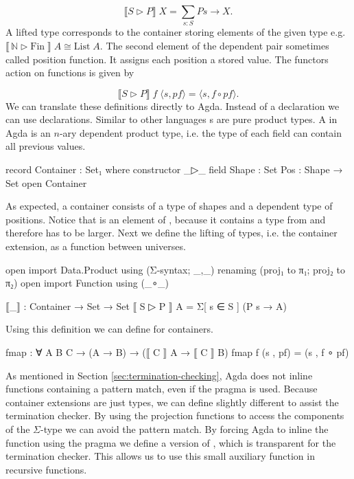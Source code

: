 $$
  \lBrack S \rhd P \rBrack\;X = \sum\limits_{s : S} P s \rightarrow X.
$$
A lifted type corresponds to the container storing elements of the given type
e.g. $\lBrack\, \mathbb{N} \rhd \mathrm{Fin}\;\rBrack \; A \cong
\mathrm{List}\;A$.
The second element of the dependent pair sometimes called position function.
It assigns each position a stored value.
The functors action on functions is given by

$$
  \lBrack S \rhd P \rBrack \;f\;\langle s , pf \rangle = \langle s , f \circ pf \rangle.
$$
We can translate these definitions directly to Agda.
Instead of a  declaration we can use 
declarations.
Similar to other languages s are pure product types.
A  in Agda is an $n$-ary dependent product type, i.e. the
type of each field can contain all previous values.

\begin{code}
record Container : Set₁ where
  constructor _▷_
  field
    Shape : Set
    Pos : Shape → Set
open Container
\end{code}
As expected, a container consists of a type of shapes and a dependent type of
positions.
Notice that  is an element of ,
because it contains a type from  and therefore has to be
larger.
Next we define the lifting of types, i.e. the container extension, as a function
between universes.

\begin{code}[hide]
open import Data.Product using (Σ-syntax; _,_) renaming (proj₁ to π₁; proj₂ to π₂)
open import Function using (_∘_)
\end{code}
\begin{code}
⟦_⟧ : Container → Set → Set
⟦ S ▷ P ⟧ A = Σ[ s ∈ S ] (P s → A)
\end{code}
Using this definition we can define  for containers.

\begin{code}
fmap : ∀ {A B C} → (A → B) → (⟦ C ⟧ A → ⟦ C ⟧ B)
fmap f (s , pf) = (s , f ∘ pf)
\end{code}
As mentioned in Section \ref{sec:termination-checking}, Agda does not inline
functions containing a pattern match, even if the  pragma
is used.
Because container extensions are just  types, we can define
 slightly different to assist the termination checker.
By using the projection functions to access the components of the $\Sigma$-type
we can avoid the pattern match.
By forcing Agda to inline the function using the pragma we define a version of
, which is transparent for the termination checker.
This allows us to use this small auxiliary function in recursive functions.

